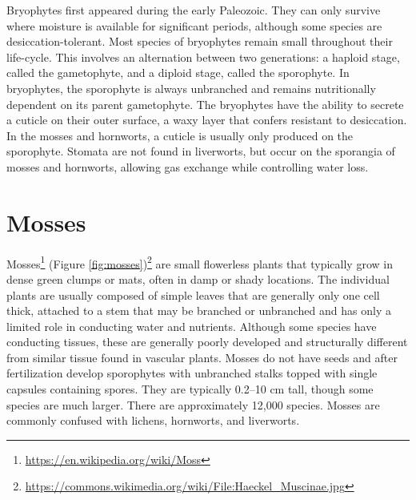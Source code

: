 \documentclass[]{book}
\let\rmarkdownfootnote\footnote%
\def\footnote{\protect\rmarkdownfootnote}
\renewcommand{\href}[2]{#2\footnote{\url{#1}}}
\theoremstyle{definition}
\theoremstyle{definition}
\theoremstyle{definition}
\theoremstyle{remark}
\begin{document}
Bryophytes first appeared during the early Paleozoic. They can only
survive where moisture is available for significant periods, although
some species are desiccation-tolerant. Most species of bryophytes remain
small throughout their life-cycle. This involves an alternation between
two generations: a haploid stage, called the gametophyte, and a diploid
stage, called the sporophyte. In bryophytes, the sporophyte is always
unbranched and remains nutritionally dependent on its parent
gametophyte. The bryophytes have the ability to secrete a cuticle on
their outer surface, a waxy layer that confers resistant to desiccation.
In the mosses and hornworts, a cuticle is usually only produced on the
sporophyte. Stomata are not found in liverworts, but occur on the
sporangia of mosses and hornworts, allowing gas exchange while
controlling water loss.

\section{Mosses}\label{mosses}

\href{https://en.wikipedia.org/wiki/Moss}{Mosses}
\href{https://commons.wikimedia.org/wiki/File:Haeckel_Muscinae.jpg}{(Figure
\ref{fig:mosses})} are small flowerless plants that typically grow in
dense green clumps or mats, often in damp or shady locations. The
individual plants are usually composed of simple leaves that are
generally only one cell thick, attached to a stem that may be branched
or unbranched and has only a limited role in conducting water and
nutrients. Although some species have conducting tissues, these are
generally poorly developed and structurally different from similar
tissue found in vascular plants. Mosses do not have seeds and after
fertilization develop sporophytes with unbranched stalks topped with
single capsules containing spores. They are typically 0.2--10 cm tall,
though some species are much larger. There are approximately 12,000
species. Mosses are commonly confused with lichens, hornworts, and
liverworts.
\end{document}
